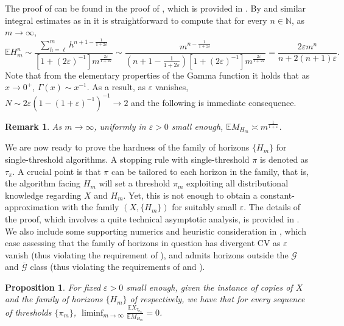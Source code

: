 \documentclass[11pt, a4paper, twoside]{article}
\newcommand{\eps}{\varepsilon}
\newcommand{\NN}{\mathbb{N}}
\newcommand{\EE}{\mathbb{E}}
\newcommand{\PGF}{\mathcal{G}}
\newcommand{\PGFd}{\overline{\mathcal{G}}}
\newtheorem{proposition}{Proposition}[section]
\newtheorem{remark}{Remark}[section]
\numberwithin{equation}{section}
\begin{document}
	The proof of  can be found in the proof of , which is provided in . By  and similar integral estimates as in  it is straightforward to compute that for every $n\in\NN$, as $m\longrightarrow\infty$,
	\begin{equation}\label{expectationn}
		\EE H_m^n\sim\frac{\sum_{h=\ell}^mh^{n+1-\frac{1}{1+2\eps}}}{[1+(2\eps)^{-1}]m^{\frac{2\eps}{1+2\eps}}}\sim\frac{m^{n-\frac{1}{1+2\eps}}}{\left(n+1-\frac{1}{1+2\eps}\right)[1+(2\eps)^{-1}]m^{\frac{2\eps}{1+2\eps}}}= \frac{2\eps m^n}{n+2(n+1)\eps}.
	\end{equation}
Note that from the elementary properties of the Gamma function it holds that as $x\longrightarrow 0^+$, $\Gamma(x)\sim x^{-1}$. As a result, as $\eps$ vanishes, $N\sim2\eps\left(1-(1+\eps)^{-1}\right)^{-1}\longrightarrow 2$ and the following is immediate consequence.
	\begin{remark}\label{asympmaxunif_H_m}
		As $m\longrightarrow\infty$, uniformly in $\eps>0$ small enough, $\EE M_{H_m}\asymp m^{\frac{1}{1+\eps}}$.
	\end{remark}
	
	We are now ready to prove the hardness of the family of horizons $\{H_m\}$ for single-threshold algorithms. A stopping rule with single-threshold $\pi$ is denoted as $\tau_\pi$. A crucial point is that $\pi$ can be tailored to each horizon in the family, that is, the algorithm facing $H_m$ will set a threshold $\pi_m$ exploiting all distributional knowledge regarding $X$ and $H_m$. Yet, this is not enough to obtain a constant-approximation with the family $(X,\{H_m\})$ for suitably small $\eps$. The details of the proof, which involves a quite technical asymptotic analysis, is provided in . We also include some supporting numerics and heuristic consideration in , which ease assessing that the family of horizons in question has divergent CV as $\eps$ vanish (thus violating the requirement of ), and admits horizons outside the $\PGF$ and $\PGFd$ class (thus violating the requirements of  and ).
	\begin{proposition}\label{hardsingle}
		For fixed $\eps>0$ small enough, given the instance of copies of $X$ and the family of horizons $\{H_m\}$ of  respectively, we have that for every sequence of thresholds $\{\pi_m\}$,  $\liminf_{m\longrightarrow\infty}\frac{\EE X_{\tau_{\pi_m}}}{\EE M_{H_m}}=0$.
	\end{proposition}
\end{document}
